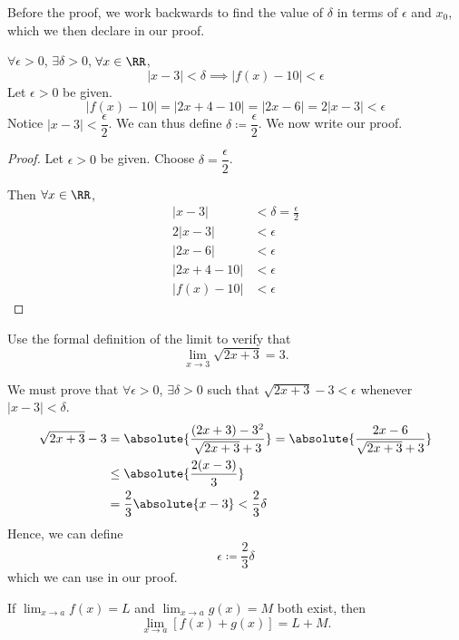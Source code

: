 Before the proof, we work backwards to find the value of $\delta$ in terms of $\epsilon$ and $x_0$, which we then declare in our proof.

$\forall \epsilon > 0$, $\exists \delta > 0$, $\forall x \in \RR$,
\[ |x-3| < \delta \implies |f(x)-10| < \epsilon \]
Let $\epsilon > 0$ be given.
\[ |f(x)-10| = |2x+4-10| = |2x-6| = 2|x-3| < \epsilon \]
Notice $|x-3| < \dfrac{\epsilon}{2}$. We can thus define $\delta \coloneqq \dfrac{\epsilon}{2}$. We now write our proof.

\begin{proof}
Let $\epsilon > 0$ be given. Choose $\delta = \dfrac{\epsilon}{2}$.

Then $\forall x \in \RR$, 
\begin{align*}
|x-3| &< \delta = \frac{\epsilon}{2} \\
2|x-3| &< \epsilon \\
|2x-6| &< \epsilon \\
|2x+4-10| &< \epsilon \\
|f(x)-10| &< \epsilon
\end{align*}
\end{proof}

\begin{exercise}{}{}
Use the formal definition of the limit to verify that 
\[ \lim_{x \to 3} \sqrt{2x+3} = 3. \]
\end{exercise}

We must prove that $\forall \epsilon > 0$, $\exists \delta > 0$ such that $\sqrt{2x+3} - 3 < \epsilon$ whenever $|x-3|<\delta$.
\begin{align*}
\sqrt{2x+3} - 3 &= \absolute{\frac{(2x+3)-3^2}{\sqrt{2x+3} + 3}} = \absolute{\frac{2x-6}{\sqrt{2x+3} + 3}} \\
&\le \absolute{\frac{2(x-3)}{3}} \\
&= \frac{2}{3} \absolute{x-3} < \frac{2}{3} \delta
\end{align*}
Hence, we can define 
\[ \epsilon \coloneqq \frac{2}{3} \delta \]
which we can use in our proof.

\begin{proposition}
If $\lim_{x\to a}f(x)=L$ and $\lim_{x\to a}g(x)=M$ both exist, then
\[ \lim_{x\to a}[f(x)+g(x)]=L+M. \]
\end{proposition}

